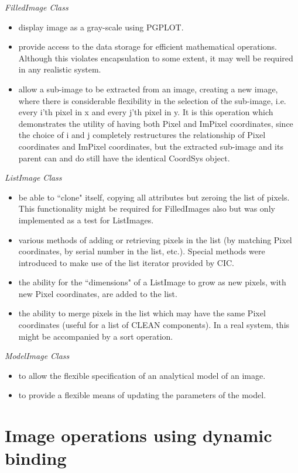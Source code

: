 {\Large\it FilledImage Class}
\begin{itemize}
\item
display image as a gray-scale using PGPLOT.
\item
provide access to the data storage for efficient mathematical operations.
Although this violates encapsulation to some extent, it may well be required
in any realistic system.
\item
allow a sub-image to be extracted from an image, creating a new image,
where there is considerable flexibility in the selection of the sub-image,
i.e. every i'th pixel in x and every j'th pixel in y. It is this operation 
which demonstrates the utility of having both Pixel and ImPixel coordinates, 
since the choice of i and j completely restructures the relationship of
Pixel coordinates and ImPixel coordinates, but the extracted sub-image and 
its parent can and do still have the identical CoordSys object.
\end{itemize}


{\Large\it ListImage Class}
\begin{itemize}
\item
be able to ``clone" itself, copying all attributes but zeroing the list of
pixels. This functionality might be required for FilledImages also but
was only implemented as a test for ListImages.
\item
various methods of adding or retrieving pixels in the list (by matching
Pixel coordinates, by serial number in the list, etc.). Special methods were
introduced to make use of the list iterator provided by CIC.
\item
the ability for the ``dimensions" of a ListImage to grow as new pixels, with
new Pixel coordinates, are added to the list.
\item
the ability to merge pixels in the list which may have the same Pixel
coordinates (useful for a list of CLEAN components). In a real system, this
might be accompanied by a sort operation.
\end{itemize}


{\Large\it ModelImage Class}
\begin{itemize}
\item
to allow the flexible specification of an analytical model of an image.
\item
to provide a flexible means of updating the parameters of the model.
\end{itemize}

\section{Image operations using dynamic binding}

